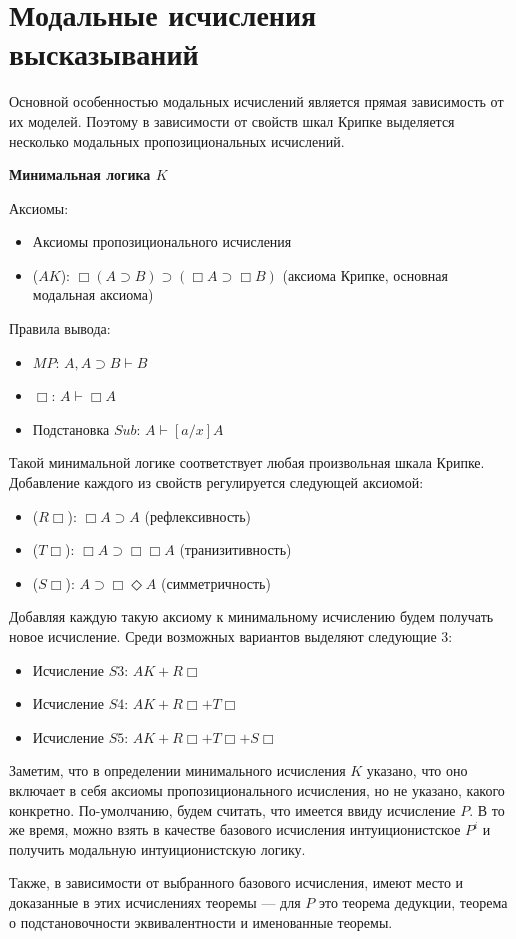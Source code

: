 \section{Модальные исчисления высказываний}

Основной особенностью модальных исчислений является прямая зависимость от их моделей. Поэтому в зависимости от свойств шкал Крипке выделяется несколько модальных пропозициональных исчислений.

\textbf{Минимальная логика $K$}

Аксиомы:
\begin{itemize}
    \item Аксиомы пропозиционального исчисления
    \item ($AK$): $\Box(A \supset B) \supset (\Box A \supset \Box B)$ (аксиома Крипке, основная модальная аксиома)
\end{itemize}

Правила вывода:
\begin{itemize}
    \item $MP$: $A, A \supset B \vdash B$
    \item $\Box$: $A \vdash \Box A$
    \item Подстановка $Sub$: $A \vdash [a/x]A$
\end{itemize}

Такой минимальной логике соответствует любая произвольная шкала Крипке. Добавление каждого из свойств регулируется следующей аксиомой:
\begin{itemize}
    \item ($R\Box$): $\Box A \supset A$ (рефлексивность)
    \item ($T\Box$): $\Box A \supset \Box \Box A$ (транизитивность)
    \item ($S\Box$): $A \supset \Box \Diamond A$ (симметричность)
\end{itemize}

Добавляя каждую такую аксиому к минимальному исчислению будем получать новое исчисление. Среди возможных вариантов выделяют следующие 3:
\begin{itemize}
    \item Исчисление $S3$: $AK + R\Box$
    \item Исчисление $S4$: $AK + R\Box + T\Box$
    \item Исчисление $S5$: $AK + R\Box + T\Box + S\Box$
\end{itemize}

\begin{remark}
    Заметим, что в определении минимального исчисления $K$ указано, что оно включает в себя аксиомы пропозиционального исчисления, но не указано, какого конкретно. По-умолчанию, будем считать, что имеется ввиду исчисление $P$. В то же время, можно взять в качестве базового исчисления интуиционистское $P^i$ и получить модальную интуиционистскую логику.

    Также, в зависимости от выбранного базового исчисления, имеют место и доказанные в этих исчислениях теоремы --- для $P$ это теорема дедукции, теорема о подстановочности эквивалентности и именованные теоремы.
\end{remark}
